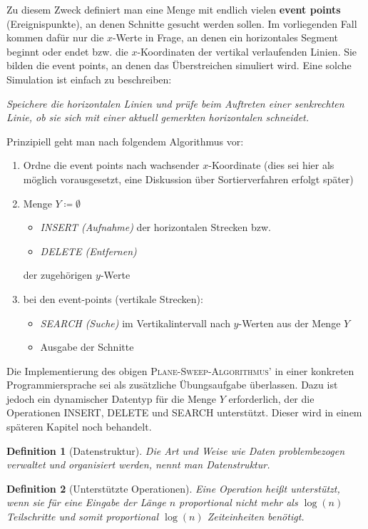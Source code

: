 \documentclass[ngerman,draft,parskip=half*,twoside]{scrreprt}
\theoremstyle{break}
\newtheorem{definition}{Definition}
\begin{document}
Zu diesem Zweck definiert man eine Menge mit endlich vielen \textbf{event
points} (Ereignispunkte), an denen Schnitte gesucht werden sollen. Im
vorliegenden Fall kommen dafür nur die $x$-Werte in Frage, an denen ein
horizontales Segment beginnt oder endet bzw. die $x$-Koordinaten der
vertikal verlaufenden Linien. Sie bilden die event points, an denen das
Überstreichen simuliert wird. Eine solche Simulation ist einfach zu
beschreiben:

\textit{Speichere die horizontalen Linien und prüfe beim Auftreten einer
senkrechten Linie, ob sie sich mit einer aktuell gemerkten horizontalen
schneidet.}

Prinzipiell geht man nach folgendem Algorithmus vor:
\begin{enumerate}
 \item Ordne die event points nach wachsender $x$-Koordinate (dies sei hier
  als möglich vorausgesetzt, eine Diskussion über Sortierverfahren erfolgt
  später)
 \item Menge $Y \coloneqq \emptyset$  
  \begin{itemize}
   \item \textit{INSERT (Aufnahme)} der horizontalen Strecken bzw.
   \item \textit{DELETE (Entfernen)}
  \end{itemize}
  der zugehörigen $y$-Werte
 \item bei den event-points (vertikale Strecken):
  \begin{itemize}
   \item \textit{SEARCH (Suche)} im Vertikalintervall nach $y$-Werten aus der 
    Menge $Y$
   \item Ausgabe der Schnitte
  \end{itemize}
\end{enumerate}

Die Implementierung des obigen
\textsc{Plane-Sweep-Algorithmus'} in einer konkreten Programmiersprache
sei als zusätzliche Übungsaufgabe überlassen. Dazu ist jedoch ein dynamischer
Datentyp für die Menge $Y$ erforderlich, der die Operationen INSERT,
DELETE und SEARCH unterstützt. Dieser wird in einem späteren Kapitel noch behandelt. 

\begin{definition}[Datenstruktur]
  Die Art und Weise wie Daten problembezogen verwaltet und organisiert
  werden, nennt man Datenstruktur.
\end{definition}

\label{ADT}
\begin{definition}[Unterstützte Operationen]
  Eine Operation heißt unterstützt, wenn sie für eine Eingabe
  der Länge $n$ proportional nicht mehr als $\log(n)$ Teilschritte und
  somit proportional $\log(n)$ Zeiteinheiten benötigt.
\end{definition}
\end{document}
